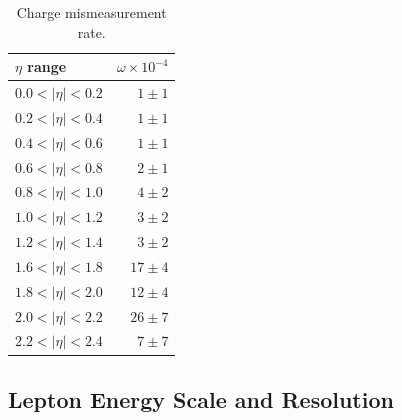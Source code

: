 \begin{table}[htbp]
  \begin{center}
\begin{tabular}{lr}
$\eta$ range        & $\omega \times 10^{-4}$    \\
\hline
$0.0<| \eta |<0.2$  & $ 1 \pm 1 $    \\ 
$0.2<| \eta |<0.4$  & $ 1 \pm 1 $    \\
$0.4<| \eta |<0.6$  & $ 1 \pm 1 $    \\
$0.6<| \eta |<0.8$  & $ 2 \pm 1 $    \\
$0.8<| \eta |<1.0$  & $ 4 \pm 2 $    \\ 
$1.0<| \eta |<1.2$  & $ 3 \pm 2 $    \\
$1.2<| \eta |<1.4$  & $ 3 \pm 2 $    \\
$1.6<| \eta |<1.8$  & $17 \pm 4 $    \\
$1.8<| \eta |<2.0$  & $12 \pm 4 $    \\
$2.0<| \eta |<2.2$  & $26 \pm 7 $    \\
$2.2<| \eta |<2.4$  & $ 7 \pm 7 $    \\
\end{tabular}
\caption{\label{tab:mischarge}Charge mismeasurement rate.}
\end{center}
\end{table}


\subsection{Lepton Energy Scale and Resolution}



